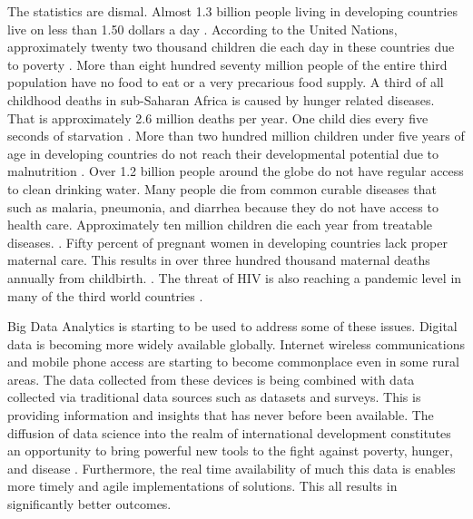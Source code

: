 \documentclass[sigconf]{acmart}
\begin{document}
The statistics are dismal. Almost 1.3 billion people living in developing countries live on less than 1.50 dollars a day \cite{www-google-top5}.  According to the United Nations, approximately twenty two thousand children die each day in these countries due to poverty \cite{www-google-top10}.   More than eight hundred seventy million people of the entire third population have no food to eat or a very precarious food supply. A third of all childhood deaths in sub-Saharan Africa is caused by hunger related diseases. That is approximately 2.6 million deaths per year. One child dies every five seconds of starvation \cite{www-google-top10}. More than two hundred million children under five years of age in developing countries do not reach their developmental potential due to malnutrition \cite{www-google-WikiDevC}.  Over 1.2 billion people around the globe do not have regular access to clean drinking water. Many people die from common curable diseases that such as malaria, pneumonia, and diarrhea because they do not have access to health care. Approximately ten million children die each year from treatable diseases. \cite{www-google-top5}.  Fifty percent of pregnant women in developing countries lack proper maternal care. This results in over three hundred thousand maternal deaths annually from childbirth.  \cite{www-google-top10}. The threat of HIV is also reaching a pandemic level in many of the third world countries \cite{www-google-top5}.

Big Data Analytics is starting to be used to address some of these issues. Digital data is becoming more widely available globally. Internet wireless communications and mobile phone access are starting to become commonplace even in some rural areas. The data collected from these devices is being combined with data collected via traditional data sources such as datasets and surveys. This is providing information and insights that has never before been available. The diffusion of data science into the realm of international development constitutes an opportunity to bring powerful new tools to the fight against poverty, hunger, and disease \cite{www-google-GloPls}. Furthermore, the real time availability of much this data is  enables more timely and agile implementations of solutions. This all results in significantly better outcomes.
\end{document}

